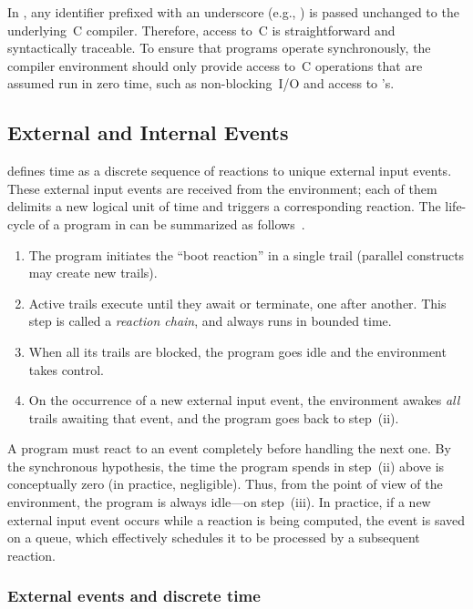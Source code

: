 In \CEU, any identifier prefixed with an underscore (e.g., ) is
passed unchanged to the underlying~C compiler.
%
Therefore, access to~C is straightforward and syntactically traceable.
%
To ensure that programs operate synchronously, the compiler environment
should only provide access to~C operations that are assumed run in zero
time, such as non-blocking~I/O and access to 's.


\subsection{External and Internal Events}
\label{sec.ceu.evts}

\CEU defines time as a discrete sequence of reactions to unique external
input events.
%
These external input events are received from the environment; each of them
delimits a new logical unit of time and triggers a corresponding reaction.
%
The life-cycle of a program in \CEU can be summarized as
follows~\cite{ceu.sensys13}.
%
\begin{enumerate}
\item The program initiates the ``boot reaction'' in a single trail
  (parallel constructs may create new trails).
\item Active trails execute until they await or terminate, one after
  another.  This step is called a \emph{reaction chain}, and always runs in
  bounded time.
\item When all its trails are blocked, the program goes idle and the
  environment takes control.
\item On the occurrence of a new external input event, the environment
  awakes \emph{all} trails awaiting that event, and the program goes back to
  step~(ii).
\end{enumerate}

A program must react to an event completely before handling the next one.
%
By the synchronous hypothesis, the time the program spends in step~(ii)
above is conceptually zero (in practice, negligible).
%
Thus, from the point of view of the environment, the program is always
idle---on step~(iii).
%
In practice, if a new external input event occurs while a reaction is being
computed, the event is saved on a queue, which effectively schedules it to
be processed by a subsequent reaction.


\subsubsection*{External events and discrete time}

